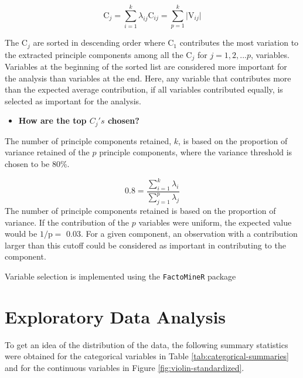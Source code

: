 \documentclass[12pt,]{article}
\providecommand{\tightlist}{%
  \setlength{\itemsep}{0pt}\setlength{\parskip}{0pt}}
\begin{document}
\[
\text{C}_j = \sum^k_{i=1}\lambda_{ij} \text{C}_{ij} = \sum^k_{p=1} \vert \text{V}_{ij} \vert 
\]

The \(\text{C}_j\) are sorted in descending order where \(\text{C}_1\)
contributes the most variation to the extracted principle components
among all the \(\text{C}_j\) for \(j=1,2,...p\), variables. Variables at
the beginning of the sorted list are considered more important for the
analysis than variables at the end. Here, any variable that contributes
more than the expected average contribution, if all variables
contributed equally, is selected as important for the analysis.

\begin{itemize}
\tightlist
\item
  \textbf{How are the top \(C_j's\) chosen?}
\end{itemize}

The number of principle components retained, \(k\), is based on the
proportion of variance retained of the \(p\) principle components, where
the variance threshold is chosen to be 80\%.

\[
0.8 = \frac{\sum^k_{i=1} \lambda_i}{\sum^p_{j=1} \lambda_j}
\] The number of principle components retained is based on the
proportion of variance. If the contribution of the \(p\) variables were
uniform, the expected value would be \(1/\text{p} =\) 0.03. For a given
component, an observation with a contribution larger than this cutoff
could be considered as important in contributing to the component.

Variable selection is implemented using the \texttt{FactoMineR} package

\newpage

\section{Exploratory Data Analysis}\label{exploratory-data-analysis}

To get an idea of the distribution of the data, the following summary
statistics were obtained for the categorical variables in Table
\ref{tab:categorical-summaries} and for the continuous variables in
Figure \ref{fig:violin-standardized}.
\end{document}
